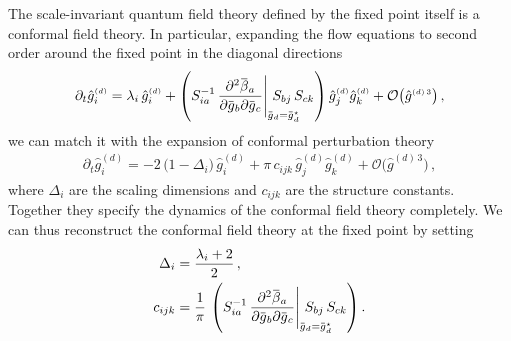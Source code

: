 \documentclass[11pt]{book}
\newcommand{\overbar}[1]{\mkern 1.5mu\overline{\mkern-1.5mu#1\mkern-1.5mu}\mkern 1.5mu}
\numberwithin{equation}{chapter}
\begin{document}
The scale-invariant quantum field theory defined by the fixed point
itself is a conformal field theory.
In particular, expanding the flow equations to second order
around the fixed point in the diagonal directions
\begin{align}
  \partial_t \hat g_i^{\scriptscriptstyle{(d)}} =
  \lambda_i \,
  \hat g_i^{\scriptscriptstyle{(d)}}
  +
  \left(
    S_{ia}^{-1} \,
    \frac{ \partial^2 \overbar \beta_a }
    { \partial \overbar g_b \partial \overbar g_c }
    \Bigg|_{ \overbar g_d = \overbar g_d^\star }
    \hspace{-7mm}
    S_{bj} \,
    S_{ck}
  \right)
  \hat g_j^{\scriptscriptstyle{(d)}}
  \hat g_k^{\scriptscriptstyle{(d)}}
  + \mathcal O \big( \hat g^{\scriptscriptstyle{(d)} \, 3} \big) \,,
\end{align}
we can match it with the expansion of conformal perturbation
theory
\begin{align}
  \partial_t \hat g_i^{\scriptscriptstyle{(d)}} =
  -2 \, \big( 1 - \Delta_i \big) \,
  \hat g_i^{\scriptscriptstyle{(d)}}
  +
  \pi \, c_{ijk} \,
  \hat g_j^{\scriptscriptstyle{(d)}}
  \hat g_k^{\scriptscriptstyle{(d)}}
  + \mathcal O \big( \hat g^{\scriptscriptstyle{(d)} \, 3} \big) \,,
\end{align}
where $\Delta_i$ are the scaling dimensions and $c_{ijk}$
are the structure constants. Together they specify the
dynamics of the conformal field theory completely.
We can thus reconstruct the conformal field theory at the fixed
point by setting
\begin{align}
  \Delta_i &= \frac{\lambda_i + 2}{2} \,, \\
  c_{ijk} &= \frac{1}{\pi} \,
  \left(
    S_{ia}^{-1} \,
    \frac{ \partial^2 \overbar \beta_a }
    { \partial \overbar g_b \partial \overbar g_c }
    \Bigg|_{ \overbar g_d = \overbar g_d^\star }
    \hspace{-7mm}
    S_{bj} \,
    S_{ck}
  \right) .
\end{align}
\end{document}
